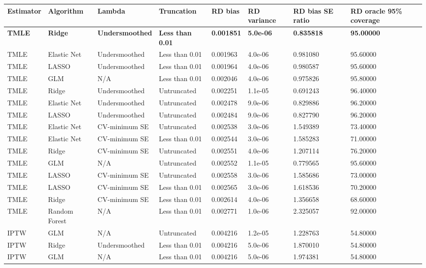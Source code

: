 
\begin{longtable}[l]{llllllll}
\toprule
Estimator & Algorithm & Lambda & Truncation & RD bias & RD variance & RD bias SE ratio & RD oracle 95\% coverage\\
\midrule
\midrule
\textbf{TMLE} & \textbf{Ridge} & \textbf{Undersmoothed} & \textbf{Less than 0.01} & \textbf{0.001851} & \textbf{5.0e-06} & \textbf{0.835818} & \textbf{95.00000}\\
\midrule
TMLE & Elastic Net & Undersmoothed & Less than 0.01 & 0.001963 & 4.0e-06 & 0.981080 & 95.60000\\
TMLE & LASSO & Undersmoothed & Less than 0.01 & 0.001964 & 4.0e-06 & 0.980587 & 95.60000\\
TMLE & GLM & N/A & Less than 0.01 & 0.002046 & 4.0e-06 & 0.975826 & 95.80000\\
TMLE & Ridge & Undersmoothed & Untruncated & 0.002251 & 1.1e-05 & 0.691243 & 96.40000\\
TMLE & Elastic Net & Undersmoothed & Untruncated & 0.002478 & 9.0e-06 & 0.829886 & 96.20000\\
TMLE & LASSO & Undersmoothed & Untruncated & 0.002484 & 9.0e-06 & 0.827790 & 96.20000\\
TMLE & Elastic Net & CV-minimum SE & Untruncated & 0.002538 & 3.0e-06 & 1.549389 & 73.40000\\
TMLE & Elastic Net & CV-minimum SE & Less than 0.01 & 0.002544 & 3.0e-06 & 1.585283 & 71.00000\\
TMLE & Ridge & CV-minimum SE & Untruncated & 0.002551 & 4.0e-06 & 1.207114 & 76.20000\\
TMLE & GLM & N/A & Untruncated & 0.002552 & 1.1e-05 & 0.779565 & 95.60000\\
TMLE & LASSO & CV-minimum SE & Untruncated & 0.002558 & 3.0e-06 & 1.585686 & 73.00000\\
TMLE & LASSO & CV-minimum SE & Less than 0.01 & 0.002565 & 3.0e-06 & 1.618536 & 70.20000\\
TMLE & Ridge & CV-minimum SE & Less than 0.01 & 0.002614 & 4.0e-06 & 1.356658 & 68.60000\\
TMLE & Random Forest & N/A & Less than 0.01 & 0.002771 & 1.0e-06 & 2.325057 & 92.00000\\
IPTW & GLM & N/A & Untruncated & 0.004216 & 1.2e-05 & 1.228763 & 54.80000\\
IPTW & Ridge & Undersmoothed & Less than 0.01 & 0.004216 & 5.0e-06 & 1.870010 & 54.80000\\
IPTW & GLM & N/A & Less than 0.01 & 0.004216 & 5.0e-06 & 1.974381 & 54.80000\\

\end{longtable}

